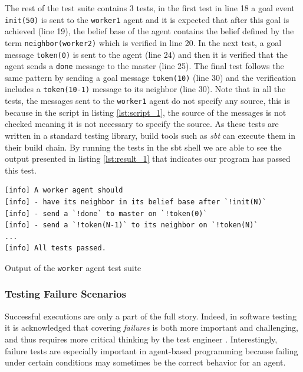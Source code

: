 
The rest of the test suite contains 3 tests, in the first test in line 18 a goal event \texttt{init(50)} is sent to the \texttt{worker1} agent and it is expected that after this goal is achieved (line 19), the belief base of the agent contains the belief defined by the term \texttt{neighbor(worker2)} which is verified in line 20. In the next test, a goal message \texttt{token(0)} is sent to the agent (line 24) and then it is verified that the agent sends a \texttt{done} message to the master (line 25). The final test follows the same pattern by sending a goal message \texttt{token(10)} (line 30) and the verification includes a \texttt{token(10-1)} message to its neighbor (line 30). Note that in all the tests, the messages sent to the \texttt{worker1} agent do not specify any source, this is because in the script in listing \ref{lst:script_1}, the source of the messages is not checked meaning it is not necessary to specify the source. As these tests are written in a standard testing library, build tools such as \textit{sbt} can execute them in their build chain. By running the tests in the sbt shell we are able to see the output presented in listing \ref{lst:result_1} that indicates our program has passed this test.

\begin{listing}[!h]
\begin{Verbatim}[fontsize=\small]
[info] A worker agent should
[info] - have its neighbor in its belief base after `!init(N)`
[info] - send a `!done` to master on `!token(0)`
[info] - send a `!token(N-1)` to its neighbor on `!token(N)`
...
[info] All tests passed.
\end{Verbatim}
\vspace{-5pt}
    \caption{Output of the \texttt{worker} agent test suite}
    \label{lst:result_1}
\vspace{-5pt}
\end{listing}




\subsubsection{Testing Failure Scenarios}
Successful executions are only a part of the full story. Indeed, in software testing it is acknowledged that covering \textit{failures} is both more important and challenging, and thus requires more critical thinking by the test engineer \cite{ArtOfTesting}. Interestingly, failure tests are especially important in agent-based programming because failing under certain conditions may sometimes be the correct behavior for an agent. 

